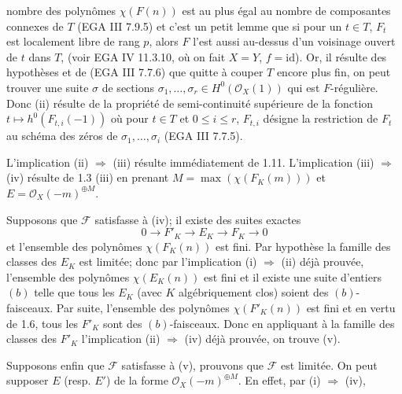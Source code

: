 nombre des polynômes \(\chi(F(n))\) est au plus égal au nombre de composantes connexes de \(T\) (EGA III 7.9.5) et c'est un petit lemme que si pour un \(t\in T\), \(F_t\) est localement libre de rang \(p\), alors \(F\) l'est aussi au-dessus d'un voisinage ouvert de \(t\) dans \(T\), (voir EGA IV 11.3.10, où on fait \(X=Y\), \(f=\mathrm{id}\)). Or, il résulte des hypothèses et de (EGA III 7.7.6) que quitte à couper \(T\) encore plus fin, on peut trouver une suite \(\sigma\) de sections \(\sigma_1,\ldots,\sigma_r\in H^0(\mathcal O_X(1))\) qui est \(F\)-régulière. Donc (ii) résulte de la propriété de semi-continuité supérieure de la fonction \(t\longmapsto h^0(F_{t,i}(-1))\) où pour \(t\in T\) et \(0\le i\le r\), \(F_{t,i}\) désigne la restriction de \(F_t\) au schéma des zéros de \(\sigma_1,\ldots,\sigma_i\) (EGA III 7.7.5).

L'implication (ii) \(\Rightarrow\) (iii) résulte immédiatement de 1.11. L'implication (iii) \(\Rightarrow\) (iv) résulte de 1.3 (iii) en prenant \(M=\max(\chi(F_K(m)))\) et \(E=\mathcal O_X(-m)^{\oplus M}\).

Supposons que \(\mathcal F\) satisfasse à (iv); il existe des suites exactes
\[
0\longrightarrow F'_K\longrightarrow E_K\longrightarrow F_K\longrightarrow0
\]
et l'ensemble des polynômes \(\chi(F_K(n))\) est fini. Par hypothèse la famille des classes des \(E_K\) est limitée; donc par l'implication (i) \(\Rightarrow\) (ii) déjà prouvée, l'ensemble des polynômes \(\chi(E_K(n))\) est fini et il existe une suite d'entiers \((b)\) telle que tous les \(E_K\) (avec \(K\) algébriquement clos) soient des \((b)\)-faisceaux. Par suite, l'ensemble des polynômes \(\chi(F'_K(n))\) est fini et en vertu de 1.6, tous les \(F'_K\) sont des \((b)\)-faisceaux. Donc en appliquant à la famille des classes des \(F'_K\) l'implication (ii) \(\Rightarrow\) (iv) déjà prouvée, on trouve (v).

Supposons enfin que \(\mathcal F\) satisfasse à (v), prouvons que \(\mathcal F\) est limitée. On peut supposer \(E\) (resp. \(E'\)) de la forme \(\mathcal O_X(-m)^{\oplus M}\). En effet, par (i) \(\Rightarrow\) (iv),
